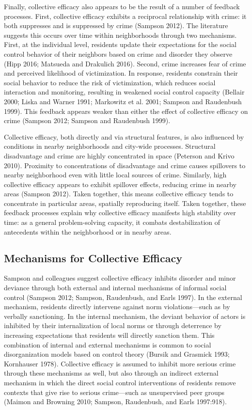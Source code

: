 \documentclass [11pt, proquest] {uwthesis}[2015/03/03]
\begin{document}
Finally, collective efficacy also appears to be the result of a number of feedback processes. First, collective efficacy exhibits a reciprocal relationship with crime: it both suppresses and is suppressed by crime (Sampson 2012). The literature suggests this occurs over time within neighborhoods through two mechanisms. First, at the individual level, residents update their expectations for the social control behavior of their neighbors based on crime and disorder they observe (Hipp 2016; Matsueda and Drakulich 2016). Second, crime increases fear of crime and perceived likelihood of victimization. In response, residents constrain their social behavior to reduce the risk of victimization, which reduces social interaction and monitoring, resulting in weakened social control capacity (Bellair 2000; Liska and Warner 1991; Markowitz et al. 2001; Sampson and Raudenbush 1999). This feedback appears weaker than either the effect of collective efficacy on crime (Sampson 2012; Sampson and Raudenbush 1999).

Collective efficacy, both directly and via structural features, is also influenced by conditions in nearby neighborhoods and city-wide processes. Structural disadvantage and crime are highly concentrated in space (Peterson and Krivo 2010). Proximity to concentrations of disadvantage and crime causes spillovers to nearby neighborhood even with little local sources of crime. Similarly, high collective efficacy appears to exhibit spillover effects, reducing crime in nearby areas (Sampson 2012). Taken together, this means collective efficacy tends to concentrate in particular areas, spatially reproducing itself. Taken together, these feedback processes explain why collective efficacy manifests high stability over time: as a general problem-solving capacity, it combats destabilization of antecedents within the neighborhood or in nearby areas.

\hypertarget{mechanisms-for-collective-efficacy}{%
\subsection{Mechanisms for Collective Efficacy}\label{mechanisms-for-collective-efficacy}}

Sampson and colleagues suggest collective efficacy inhibits disorder and minor deviance through both external and internal mechanisms of informal social control (Sampson 2012; Sampson, Raudenbush, and Earls 1997). In the external mechanism, residents directly intervene against norm violations---such as by verbally sanctioning. In the internal mechanism, the deviant behavior of actors is inhibited by their internalization of local norms or through deterrence by increasing expectations that residents will directly sanction them. This combination of internal and external mechanisms is common to social disorganization models based on control theory (Bursik and Grasmick 1993; Kornhauser 1978). Collective efficacy is assumed to inhibit more serious crime through these mechanisms as well, but also through an indirect external mechanism in which the direct social control interventions of residents remove contexts that give rise to serious crime---such as unsupervised peer groups (Maimon and Browning 2010; Sampson, Raudenbush, and Earls 1997:918).
\end{document}
